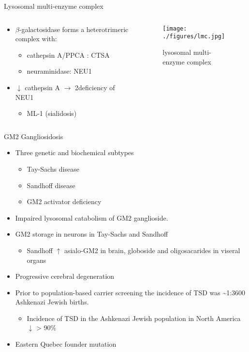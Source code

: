 \documentclass[presentation, smaller]{beamer}
\begin{document}
\begin{frame}[label={sec:orgheadline4}]{Lysosomal multi-enzyme complex}
\begin{columns}
\begin{column}{0.6\columnwidth}
\begin{itemize}
\item \(\beta\)-galactosidase forms a heterotrimeric complex with:
\begin{itemize}
\item cathepsin A/PPCA : CTSA
\item neuraminidase: NEU1
\end{itemize}

\item \(\downarrow\) cathepsin A \(\to\) 2\degree  deficiency of NEU1
\begin{itemize}
\item ML-1 (sialidosis)
\end{itemize}
\end{itemize}
\end{column}

\begin{column}{0.5\columnwidth}
\begin{figure}[htb]
\centering
\texttt{[image: ./figures/lmc.jpg]}
\caption[lmc]{\label{fig:lmc}
lysosomal multi-enzyme complex}
\end{figure}
\end{column}
\end{columns}
\end{frame}


\begin{frame}[label={sec:orgheadline5}]{GM2 Gangliosidosis}
\begin{itemize}
\item Three genetic and biochemical subtypes
\begin{itemize}
\item Tay-Sachs disease
\item Sandhoff disease
\item GM2 activator deficiency
\end{itemize}
\item Impaired lysosomal catabolism of GM2 ganglioside.
\item GM2 storage in neurons in Tay-Sachs and Sandhoff
\begin{itemize}
\item Sandhoff \(\uparrow\) asialo-GM2 in brain, globoside and oligosacarides in viseral organs
\end{itemize}
\item Progressive cerebral degeneration
\item Prior to population-based carrier screening the incidence of TSD was \textasciitilde{}1:3600 Ashkenazi Jewish births.
\begin{itemize}
\item Incidence of TSD in the Ashkenazi Jewish population in North America \(\downarrow\) > 90\%
\end{itemize}
\item Eastern Quebec founder mutation
\end{itemize}
\end{frame}
\end{document}
